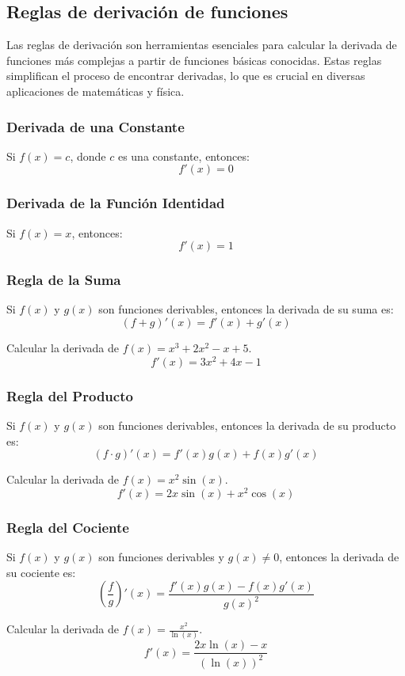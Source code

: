 \subsection{Reglas de derivación de funciones}


Las reglas de derivación son herramientas esenciales para calcular la derivada de funciones más complejas a partir de funciones básicas conocidas. Estas reglas simplifican el proceso de encontrar derivadas, lo que es crucial en diversas aplicaciones de matemáticas y física.


\subsubsection{Derivada de una Constante}
Si $f(x) = c$, donde $c$ es una constante, entonces:
\[
f'(x) = 0
\]

\subsubsection{Derivada de la Función Identidad}
Si $f(x) = x$, entonces:
\[
f'(x) = 1
\]

\subsubsection{Regla de la Suma}
Si $f(x)$ y $g(x)$ son funciones derivables, entonces la derivada de su suma es:
\begin{equation}
    (f + g)'(x) = f'(x) + g'(x)
\end{equation}
\begin{example}
    Calcular la derivada de $f(x) = x^3 + 2x^2 - x + 5$.
\[
f'(x) = 3x^2 + 4x - 1
\]
\end{example}
\subsubsection{Regla del Producto}
Si $f(x)$ y $g(x)$ son funciones derivables, entonces la derivada de su producto es:
\begin{equation}
    (f \cdot g)'(x) = f'(x)g(x) + f(x)g'(x)
\end{equation}
\begin{example}
    Calcular la derivada de $f(x) = x^2 \sin(x)$.
\[
f'(x) = 2x\sin(x) + x^2\cos(x)
\]
\end{example}
\subsubsection{Regla del Cociente}
Si $f(x)$ y $g(x)$ son funciones derivables y $g(x) \neq 0$, entonces la derivada de su cociente es:
\begin{equation}
    \left(\frac{f}{g}\right)'(x) = \frac{f'(x)g(x) - f(x)g'(x)}{g(x)^2}
\end{equation}
\begin{example}
    Calcular la derivada de $f(x) = \frac{x^2}{\ln(x)}$.
\[
f'(x) = \frac{2x\ln(x) - x}{(\ln(x))^2}
\]
\end{example}

